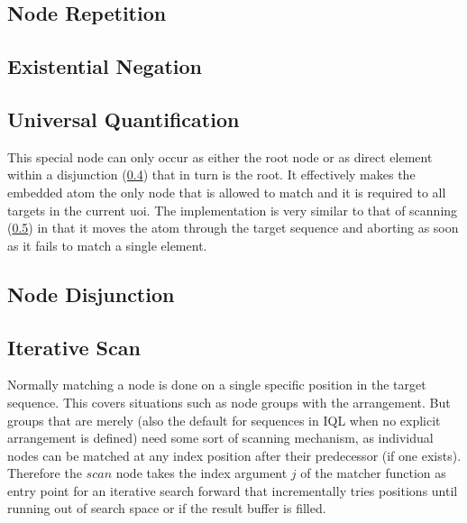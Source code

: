 \documentclass[11pt,a4paper]{report}
\begin{document}
\subsection{Node Repetition}
\label{sec:seq-repetition}

\subsection{Existential Negation}
\label{sec:seq-negation}

\subsection{Universal Quantification}
\label{sec:seq-universal}

This special node can only occur as either the root node or as direct element within a disjunction (\cref{sec:seq-branch}) that in turn is the root.
It effectively makes the embedded atom the only node that is allowed to match and it is required to all targets in the current \ac{uoi}.
The implementation is very similar to that of scanning (\cref{sec:seq-scan}) in that it moves the atom through the target sequence and aborting as soon as it fails to match a single element.

\subsection{Node Disjunction}
\label{sec:seq-branch}

\subsection{Iterative Scan}
\label{sec:seq-scan}

Normally matching a node is done on a single specific position in the target sequence.
This covers situations such as node groups with the  arrangement.
But groups that are merely  (also the default for sequences in IQL when no explicit arrangement is defined) need some sort of scanning mechanism, as individual nodes can be matched at any index position after their predecessor (if one exists).
Therefore the $scan$ node takes the index argument $j$ of the matcher function as entry point for an iterative search forward that incrementally tries positions until running out of search space or if the result buffer is filled.
\end{document}
